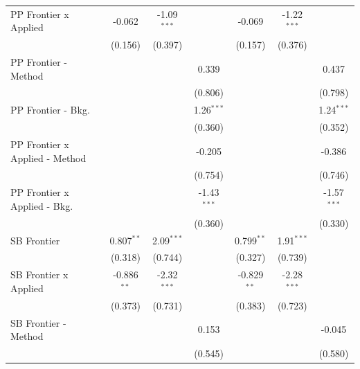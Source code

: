 \begin{tabular}{lcccccc}
   PP Frontier x Applied          & -0.062         & -1.09$^{***}$  &                & -0.069         & -1.22$^{***}$  &   \\   
                                  & (0.156)        & (0.397)        &                & (0.157)        & (0.376)        &   \\   
   PP Frontier - Method           &                &                & 0.339          &                &                & 0.437\\   
                                  &                &                & (0.806)        &                &                & (0.798)\\   
   PP Frontier - Bkg.             &                &                & 1.26$^{***}$   &                &                & 1.24$^{***}$\\   
                                  &                &                & (0.360)        &                &                & (0.352)\\   
   PP Frontier x Applied - Method &                &                & -0.205         &                &                & -0.386\\   
                                  &                &                & (0.754)        &                &                & (0.746)\\   
   PP Frontier x Applied - Bkg.   &                &                & -1.43$^{***}$  &                &                & -1.57$^{***}$\\   
                                  &                &                & (0.360)        &                &                & (0.330)\\   
   SB Frontier                    & 0.807$^{**}$   & 2.09$^{***}$   &                & 0.799$^{**}$   & 1.91$^{***}$   &   \\   
                                  & (0.318)        & (0.744)        &                & (0.327)        & (0.739)        &   \\   
   SB Frontier x Applied          & -0.886$^{**}$  & -2.32$^{***}$  &                & -0.829$^{**}$  & -2.28$^{***}$  &   \\   
                                  & (0.373)        & (0.731)        &                & (0.383)        & (0.723)        &   \\   
   SB Frontier - Method           &                &                & 0.153          &                &                & -0.045\\   
                                  &                &                & (0.545)        &                &                & (0.580)\\   

\end{tabular}
